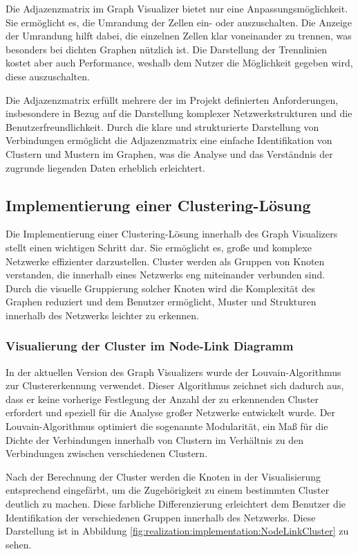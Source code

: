Die Adjazenzmatrix im Graph Visualizer bietet nur eine Anpassungsmöglichkeit. Sie ermöglicht es, die Umrandung der Zellen ein- oder auszuschalten. Die Anzeige der Umrandung hilft dabei, die einzelnen Zellen klar voneinander zu trennen, was besonders bei dichten Graphen nützlich ist. Die Darstellung der Trennlinien kostet aber auch Performance, weshalb dem Nutzer die Möglichkeit gegeben wird, diese auszuschalten.

Die Adjazenzmatrix erfüllt mehrere der im Projekt definierten Anforderungen, insbesondere in Bezug auf die Darstellung komplexer Netzwerkstrukturen und die Benutzerfreundlichkeit. Durch die klare und strukturierte Darstellung von Verbindungen ermöglicht die Adjazenzmatrix eine einfache Identifikation von Clustern und Mustern im Graphen, was die Analyse und das Verständnis der zugrunde liegenden Daten erheblich erleichtert.

\subsection{Implementierung einer Clustering-Lösung}

Die Implementierung einer Clustering-Lösung innerhalb des Graph Visualizers stellt einen wichtigen Schritt dar. Sie ermöglicht es, große und komplexe Netzwerke effizienter darzustellen. Cluster werden als Gruppen von Knoten verstanden, die innerhalb eines Netzwerks eng miteinander verbunden sind. Durch die visuelle Gruppierung solcher Knoten wird die Komplexität des Graphen reduziert und dem Benutzer ermöglicht, Muster und Strukturen innerhalb des Netzwerks leichter zu erkennen.

\subsubsection{Visualierung der Cluster im Node-Link Diagramm}

In der aktuellen Version des Graph Visualizers wurde der Louvain-Algorithmus zur Clustererkennung verwendet. Dieser Algorithmus zeichnet sich dadurch aus, dass er keine vorherige Festlegung der Anzahl der zu erkennenden Cluster erfordert und speziell für die Analyse großer Netzwerke entwickelt wurde. Der Louvain-Algorithmus optimiert die sogenannte Modularität, ein Maß für die Dichte der Verbindungen innerhalb von Clustern im Verhältnis zu den Verbindungen zwischen verschiedenen Clustern.

Nach der Berechnung der Cluster werden die Knoten in der Visualisierung entsprechend eingefärbt, um die Zugehörigkeit zu einem bestimmten Cluster deutlich zu machen. Diese farbliche Differenzierung erleichtert dem Benutzer die Identifikation der verschiedenen Gruppen innerhalb des Netzwerks. Diese Darstellung ist in Abbildung \ref{fig:realization:implementation:NodeLinkCluster} zu sehen.

